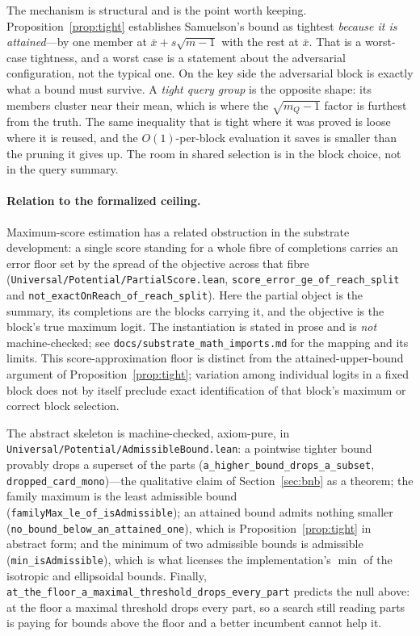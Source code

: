 \documentclass[11pt]{article}
\numberwithin{equation}{section}
\begin{document}
The mechanism is structural and is the point worth keeping. Proposition~\ref{prop:tight} establishes
Samuelson's bound as tightest \emph{because it is attained}---by one member at
$\bar{x}+s\sqrt{m-1}$ with the rest at $\bar{x}$. That is a worst-case tightness, and a worst case is a
statement about the adversarial configuration, not the typical one. On the key side the adversarial block is
exactly what a bound must survive. A \emph{tight query group} is the opposite shape: its members cluster near
their mean, which is where the $\sqrt{m_Q-1}$ factor is furthest from the truth. The same inequality that is
tight where it was proved is loose where it is reused, and the $O(1)$-per-block evaluation it saves is smaller
than the pruning it gives up. The room in shared selection is in the block choice, not in the query summary.

\paragraph{Relation to the formalized ceiling.} Maximum-score estimation has a related obstruction
in the substrate development: a single score standing for a whole fibre of completions carries an error floor
set by the spread of the objective across that fibre
(\texttt{Universal/Potential/PartialScore.lean}, \texttt{score\_error\_ge\_of\_reach\_split} and
\texttt{not\_exactOnReach\_of\_reach\_split}). Here the partial object is the summary, its completions are the
blocks carrying it, and the objective is the block's true maximum logit. The instantiation is stated in prose
and is \emph{not} machine-checked; see \texttt{docs/substrate\_math\_imports.md} for the mapping and its
limits. This score-approximation floor is distinct from the attained-upper-bound argument of
Proposition~\ref{prop:tight}; variation among individual logits in a fixed block does not by itself
preclude exact identification of that block's maximum or correct block selection.

The abstract skeleton is machine-checked, axiom-pure, in
\texttt{Universal/Potential/Admissible\-Bound.lean}: a pointwise tighter bound provably drops a superset of
the parts (\texttt{a\_higher\_bound\_drops\_a\_subset}, \texttt{dropped\_card\_mono})---the qualitative claim
of Section~\ref{sec:bnb} as a theorem; the family maximum is the least admissible bound
(\texttt{familyMax\_le\_of\_isAdmissible}); an attained bound admits nothing smaller
(\texttt{no\_bound\_below\_an\_attained\_one}), which is Proposition~\ref{prop:tight} in abstract form; and
the minimum of two admissible bounds is admissible (\texttt{min\_isAdmissible}), which is what licenses the
implementation's $\min$ of the isotropic and ellipsoidal bounds.
Finally, \texttt{at\_the\_floor\_a\_maximal\_threshold\_drops\_every\_part} predicts the null above: at the
floor a maximal threshold drops every part, so a search still reading parts is paying for bounds above the
floor and a better incumbent cannot help it.
\end{document}
